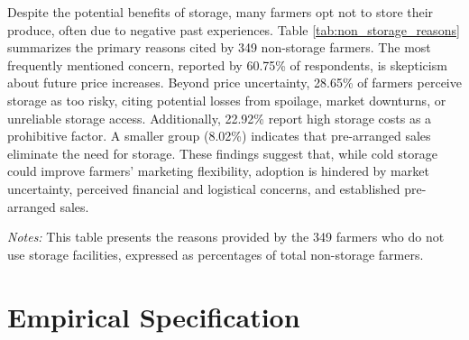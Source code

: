 Despite the potential benefits of storage, many farmers opt not to store their produce, often due to negative past experiences. Table \ref{tab:non_storage_reasons} summarizes the primary reasons cited by 349 non-storage farmers. The most frequently mentioned concern, reported by 60.75\% of respondents, is skepticism about future price increases. Beyond price uncertainty, 28.65\% of farmers perceive storage as too risky, citing potential losses from spoilage, market downturns, or unreliable storage access. Additionally, 22.92\% report high storage costs as a prohibitive factor. A smaller group (8.02\%) indicates that pre-arranged sales eliminate the need for storage. These findings suggest that, while cold storage could improve farmers' marketing flexibility, adoption is hindered by market uncertainty, perceived financial and logistical concerns, and established pre-arranged sales.  


\begin{table}[H]
    \centering
    \footnotesize
    \caption{Reasons for Not Using Storage Facilities}
    \label{tab:non_storage_reasons}
        \begin{tablenotes}
            \item \textit{Notes:} This table presents the reasons provided by the 349 farmers who do not use storage facilities, expressed as percentages of total non-storage farmers.
        \end{tablenotes}
\end{table}


\section{Empirical Specification}
